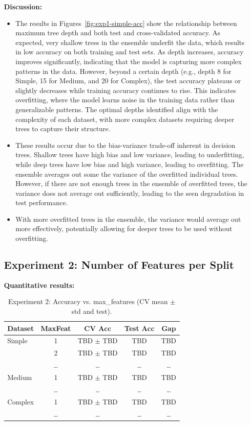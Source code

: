 \documentclass[conference]{IEEEtran}
\begin{document}
\textbf{Discussion:}
\begin{itemize}
  \item The results in Figures~\ref{fig:exp1-simple-acc} show the relationship between maximum tree depth and both test and cross-validated 
  accuracy. As expected, very shallow trees in the ensemble underfit the data, which results in low accuracy on both training and test sets. As depth 
  increases, accuracy improves significantly, indicating that the model is capturing more complex patterns in the data. However, beyond a certain depth 
  (e.g., depth 8 for Simple, 15 for Medium, and 20 for Complex), the test accuracy plateaus or slightly decreases while training accuracy 
  continues to rise. This indicates overfitting, where the model learns noise in the training data rather than generalizable patterns. The optimal 
  depths identified align with the complexity of each dataset, with more complex datasets requiring deeper trees to capture their structure.
  \item These results occur due to the bias-variance trade-off inherent in decision trees. Shallow trees have high bias and low variance, leading to 
  underfitting, while deep trees have low bias and high variance, leading to overfitting. The ensemble averages out some the variance of the overfitted individual 
  trees. However, if there are not enough trees in the ensemble of overfitted trees, the variance does not average out sufficiently, leading to the seen 
  degradation in test performance.
    \item With more overfitted trees in the ensemble, the variance would average out more effectively, potentially allowing for deeper trees to be
    used without overfitting. 
  \end{itemize}

\subsection{Experiment 2: Number of Features per Split}
\label{sec:results-exp2}

\textbf{Quantitative results:}
\begin{table}[h]
\centering
\caption{Experiment 2: Accuracy vs. max\_features (CV mean $\pm$ std and test).}
\label{tab:exp2-features}
\begin{tabular}{lcccc}
\toprule
Dataset & MaxFeat & CV Acc & Test Acc & Gap \\
\midrule
Simple  & 1   & TBD $\pm$ TBD & TBD & TBD \\
        & 2   & TBD $\pm$ TBD & TBD & TBD \\
        & \dots & \dots & \dots & \dots \\
Medium  & 1   & TBD $\pm$ TBD & TBD & TBD \\
        & \dots & \dots & \dots & \dots \\
Complex & 1   & TBD $\pm$ TBD & TBD & TBD \\
        & \dots & \dots & \dots & \dots \\
\bottomrule
\end{tabular}
\end{table}
\end{document}
